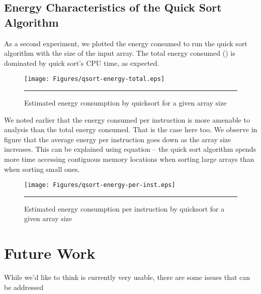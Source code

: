 \subsection{Energy Characteristics of the Quick Sort Algorithm}

As a second experiment, we plotted the energy consumed to run the
quick sort algorithm with the size of the input array.  The total
energy consumed () is
dominated by quick sort's CPU time, as expected.

\begin{figure}[htbp]
  \centering
  \texttt{[image: Figures/qsort-energy-total.eps]}
  \rule{35em}{0.5pt}
  \caption{Estimated energy consumption by quicksort for a given array size}
  \label{fig:qsort-energy-per-array-length}
\end{figure}

We noted earlier that the energy consumed per instruction is more
amenable to analysis than the total energy consumed.  That is the case
here too.  We observe in figure
 that the average
energy per instruction goes down as the array size increases.  This
can be explained using equation  -- the quick sort
algorithm spends more time accessing contiguous memory locations when
sorting large arrays than when sorting small ones.

\begin{figure}[htbp]
  \centering
  \texttt{[image: Figures/qsort-energy-per-inst.eps]}
  \rule{35em}{0.5pt}
  \caption{Estimated energy consumption per instruction by quicksort
    for a given array size}
  \label{fig:qsort-energy-per-inst-per-array-length}
\end{figure}

\section{Future Work}

While we'd like to think \wattage is currently very usable, there are
some issues that can be addressed

